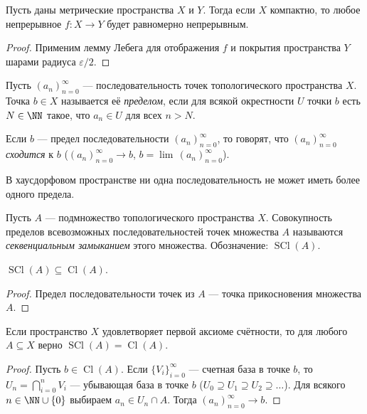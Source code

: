 \documentclass[12pt,a4paper]{article}
\DeclareMathOperator{\Cl}{Cl}
\DeclareMathOperator{\SCl}{SCl}
\begin{document}
    \begin{theorem}
        Пусть даны метрические пространства $X$ и $Y$. Тогда если $X$ компактно, то любое непрерывное $f: X \to Y$ будет равномерно непрерывным.
    \end{theorem}

    \begin{proof}
        Применим лемму Лебега для отображения $f$ и покрытия пространства $Y$ шарами радиуса $\varepsilon/2$.
    \end{proof}

    \begin{definition}
        Пусть $(a_n)_{n=0}^\infty$ --- последовательность точек топологического пространства $X$. Точка $b \in X$ называется её \emph{пределом}, если для всякой окрестности $U$ точки $b$ есть $N \in \NN$ такое, что $a_n \in U$ для всех $n > N$.
        
        Если $b$ --- предел последовательности $(a_n)_{n=0}^\infty$, то говорят, что $(a_n)_{n=0}^\infty$ \emph{сходится} к $b$ ($(a_n)_{n=0}^\infty \to b$, $b = \lim\, (a_n)_{n=0}^\infty$).
    \end{definition}

    \begin{theorem}
        В хаусдорфовом пространстве ни одна последовательность не может иметь более одного предела.
    \end{theorem}

    \begin{definition}
        Пусть $A$ --- подмножество топологического пространства $X$. Совокупность пределов всевозможных последовательностей точек множества $A$ называются \emph{секвенциальным замыканием} этого множества. Обозначение: $\SCl(A)$.
    \end{definition}

    \begin{theorem}
        $\SCl(A) \subseteq \Cl(A)$.
    \end{theorem}

    \begin{proof}
        Предел последовательности точек из $A$ --- точка прикосновения множества $A$.
    \end{proof}

    \begin{theorem}
        Если пространство $X$ удовлетворяет первой аксиоме счётности, то для любого $A \subseteq X$ верно $\SCl(A) = \Cl(A)$.
    \end{theorem}

    \begin{proof}
        Пусть $b \in \Cl(A)$. Если $\{V_i\}_{i = 0}^\infty$ --- счетная база в точке $b$, то $U_n = \bigcap_{i = 0}^n V_i$ --- убывающая база в точке $b$ ($U_0 \supseteq U_1 \supseteq U_2 \supseteq \dots$). Для всякого $n \in \NN \cup \{0\}$ выбираем $a_n \in U_n \cap A$. Тогда $(a_n)_{n=0}^\infty \to b$.
    \end{proof}
\end{document}

